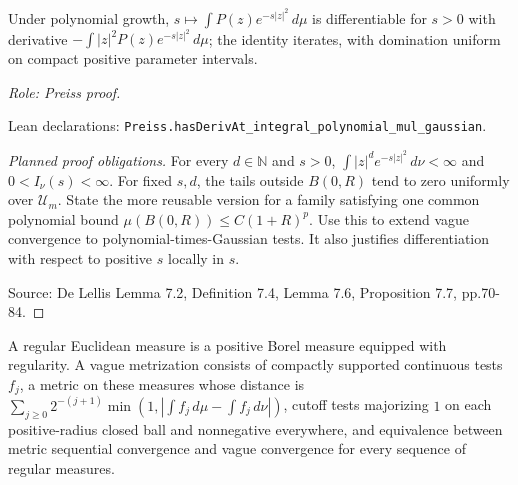 \begin{lemma}
\label{lem:gaussian-parameter-derivative}







Under polynomial growth, $s\mapsto\int P(z)e^{-s|z|^2}\,d\mu$ is differentiable for $s>0$ with derivative $-\int |z|^2P(z)e^{-s|z|^2}\,d\mu$; the identity iterates, with domination uniform on compact positive parameter intervals.
\par\emph{Role: Preiss proof.}
\par Lean declarations: \texttt{Preiss.hasDerivAt\_integral\_polynomial\_mul\_gaussian}.
\end{lemma}
\begin{proof}[Planned proof obligations]

For every $d\in\mathbb N$ and $s>0$,
$\int |z|^d e^{-s|z|^2}\,d\nu<\infty$ and $0<I_\nu(s)<\infty$.
For fixed $s,d$, the tails outside $B(0,R)$ tend to zero uniformly over
$\mathcal U_m$. State the more reusable version for a family satisfying one
common polynomial bound $\mu(B(0,R))\leq C(1+R)^p$.
Use this to extend vague convergence to polynomial-times-Gaussian tests.
It also justifies differentiation with respect to positive $s$ locally in $s$.
\par Source: De Lellis Lemma 7.2, Definition 7.4, Lemma 7.6, Proposition 7.7, pp.70-84.
\end{proof}

\begin{definition}
\label{def:vague-metrization}
A regular Euclidean measure is a positive Borel measure equipped with regularity. A vague metrization consists of compactly supported continuous tests $f_j$, a metric on these measures whose distance is $\sum_{j\geq0}2^{-(j+1)}\min(1,|\int f_j\,d\mu-\int f_j\,d\nu|)$, cutoff tests majorizing $1$ on each positive-radius closed ball and nonnegative everywhere, and equivalence between metric sequential convergence and vague convergence for every sequence of regular measures.
\end{definition}


